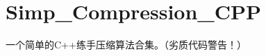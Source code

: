 \chapter{Simp\+\_\+\+Compression\+\_\+\+CPP}
\hypertarget{md__r_e_a_d_m_e}{}\label{md__r_e_a_d_m_e}
\label{md__r_e_a_d_m_e_autotoc_md0}%
%


一个简单的\+C++练手压缩算法合集。（劣质代码警告！） 